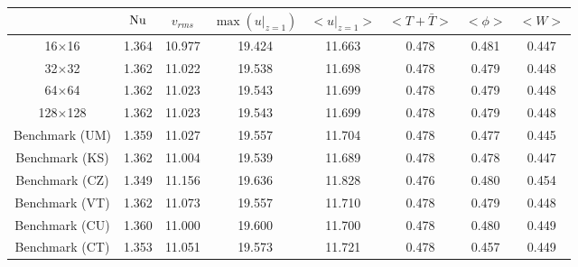 \begin{tabular}{c|ccccccc}
    & $\mathrm{Nu}$ & $v_{rms}$ & $\max(u|_{z=1})$ & $<u|_{z=1}>$ & $<T + \bar{T}>$ & $<\phi>$ & $<W>$ \\
\hline
16$\times$16 & 1.364 & 10.977 & 19.424 & 11.663 & 0.478 & 0.481 & 0.447 \\
32$\times$32 & 1.362 & 11.022 & 19.538 & 11.698 & 0.478 & 0.479 & 0.448 \\
64$\times$64 & 1.362 & 11.023 & 19.543 & 11.699 & 0.478 & 0.479 & 0.448 \\
128$\times$128 & 1.362 & 11.023 & 19.543 & 11.699 & 0.478 & 0.479 & 0.448 \\
\hline
Benchmark (UM) & 1.359 & 11.027 & 19.557 & 11.704 & 0.478 & 0.477 & 0.445 \\
Benchmark (KS) & 1.362 & 11.004 & 19.539 & 11.689 & 0.478 & 0.478 & 0.447 \\
Benchmark (CZ) & 1.349 & 11.156 & 19.636 & 11.828 & 0.476 & 0.480 & 0.454 \\
Benchmark (VT) & 1.362 & 11.073 & 19.557 & 11.710 & 0.478 & 0.479 & 0.448 \\
Benchmark (CU) & 1.360 & 11.000 & 19.600 & 11.700 & 0.478 & 0.480 & 0.449 \\
Benchmark (CT) & 1.353 & 11.051 & 19.573 & 11.721 & 0.478 & 0.457 & 0.449 \\
\end{tabular}
